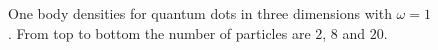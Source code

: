 \begin{figure}
\begin{center}
     \\
     \\
  \caption{One body densities for quantum dots in three dimensions with $\omega=1$. From top to bottom the number of particles are $2$, $8$ and $20$.}
  \label{fig:OBD_QDOTS3D_lowfreq}
 \end{center}
\end{figure}

